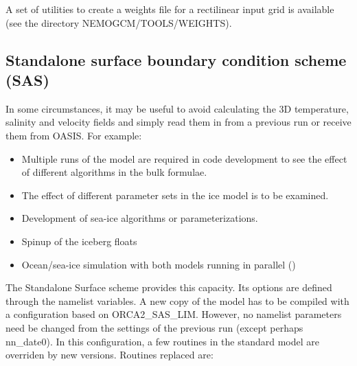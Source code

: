 \documentclass[../main/NEMO_manual]{subfiles}
\begin{document}
A set of utilities to create a weights file for a rectilinear input grid is available
(see the directory NEMOGCM/TOOLS/WEIGHTS).

\subsection{Standalone surface boundary condition scheme (SAS)}
\label{subsec:SBC_SAS}

\begin{listing}
  \caption{}
  \label{lst:namsbc_sas}
\end{listing}

In some circumstances, it may be useful to avoid calculating the 3D temperature,
salinity and velocity fields and simply read them in from a previous run or receive them from OASIS.
For example:

\begin{itemize}
\item Multiple runs of the model are required in code development to
  see the effect of different algorithms in the bulk formulae.
\item The effect of different parameter sets in the ice model is to be examined.
\item Development of sea-ice algorithms or parameterizations.
\item Spinup of the iceberg floats
\item Ocean/sea-ice simulation with both models running in parallel ()
\end{itemize}

The Standalone Surface scheme provides this capacity.
Its options are defined through the  namelist variables.
A new copy of the model has to be compiled with a configuration based on ORCA2\_SAS\_LIM.
However, no namelist parameters need be changed from the settings of the previous run (except perhaps nn\_date0).
In this configuration, a few routines in the standard model are overriden by new versions.
Routines replaced are:
\end{document}
